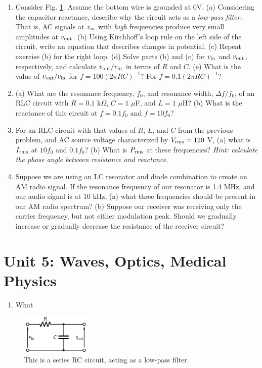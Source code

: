 \documentclass[12pt,twocolumn]{article}
\begin{document}
\begin{enumerate}
\item Consider Fig. \ref{fig:RC}.  Assume the bottom wire is grounded at 0V.  (a) Considering the capacitor reactance, describe why the circuit acts as a \textit{low-pass filter.}  That is, AC signals at $v_{\rm in}$ with \textit{high} frequencies produce very small amplitudes at $v_{\rm out}$. (b) Using Kirchhoff's loop rule on the left side of the circuit, write an equation that describes changes in potential.  (c) Repeat exercise (b) for the right loop.  (d) Solve parts (b) and (c) for $v_{\rm in}$ and $v_{\rm out}$, respectively, and calculate $v_{\rm out}/v_{\rm in}$ in terms of $R$ and $C$.  (e) What is the value of $v_{\rm out}/v_{\rm in}$ for $f = 100(2\pi R C)^{-1}$? For $f = 0.1(2\pi R C)^{-1}$? \\ \vspace{6cm}
\item (a) What are the resonance frequency, $f_0$, and resonance width, $\Delta f/f_0$, of an RLC circuit with $R = 0.1$ k$\Omega$, $C = 1$ $\mu$F, and $L = 1$ $\mu$H? (b) What is the reactance of this circuit at $f = 0.1f_0$ and $f = 10f_0$? \\ \vspace{3cm}
\item For an RLC circuit with that values of $R$, $L$, and $C$ from the previous problem, and AC source voltage characterized by $V_{\rm rms} = 120$ V, (a) what is $I_{\rm rms}$ at $10 f_0$ and $0.1 f_0$? (b) What is $P_{\rm rms}$ at these frequencies? \textit{Hint: calculate the phase angle between resistance and reactance.} \\ \vspace{4cm}
\item Suppose we are using an LC resonator and diode combination to create an AM radio signal.  If the resonance frequency of our resonator is 1.4 MHz, and our audio signal is at 10 kHz, (a) what three frequencies should be present in our AM radio spectrum?  (b) Suppose our receiver was receiving only the carrier frequency, but not either modulation peak.  Should we gradually increase or gradually decrease the resistance of the receiver circuit?  \\ \vspace{2cm}
\end{enumerate}

\section{Unit 5: Waves, Optics, Medical Physics}

\noindent
\begin{enumerate}
\item What 
\end{enumerate}

\begin{figure}[hb]
\centering
\includegraphics[width=0.3\textwidth]{low-pass.png}
\caption{\label{fig:RC} \small This is a series RC circuit, acting as a low-pass filter.}
\end{figure}
\end{document}
